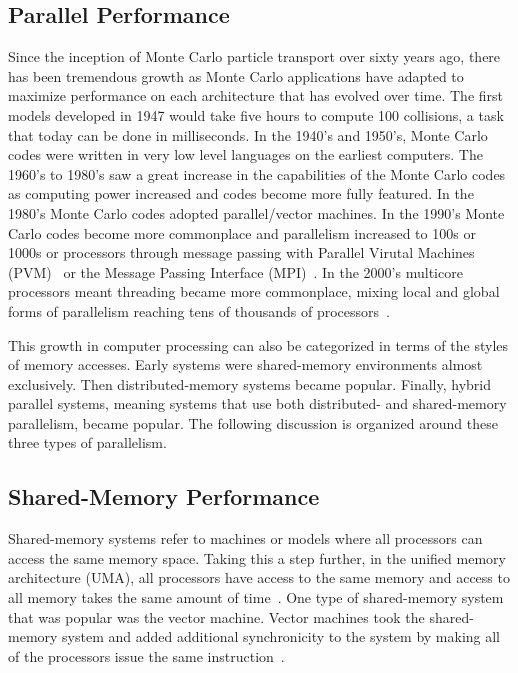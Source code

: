 \subsection{ \textbf{ Parallel Performance }}

Since the inception of Monte Carlo particle transport over sixty years ago,
there has been tremendous growth as Monte Carlo applications have adapted to maximize performance on each architecture that has evolved over time.
%
The first models developed in 1947 would take five hours to compute 100 collisions, a task that today can be done in milliseconds.
%
In the 1940's and 1950's, Monte Carlo codes were written in very low level languages on the earliest computers.
%
The 1960's to 1980's saw a great increase in the capabilities of the Monte Carlo codes as computing power increased and codes become more fully featured.
%
In the 1980's Monte Carlo codes adopted parallel/vector machines.
%
In the 1990's Monte Carlo codes become more commonplace and parallelism increased to 100s or 1000s or processors through message passing with Parallel Virutal Machines (PVM)~\cite{pvm2011} or the Message Passing Interface (MPI)~\cite{blaiseMPI}.
%
In the 2000's multicore processors meant threading became more commonplace, mixing local and global forms of parallelism reaching tens of thousands of processors~\cite{brown2011recent}.
%

This growth in computer processing can also be categorized in terms of the styles of memory accesses.
%
Early systems were shared-memory environments almost exclusively.
%
Then distributed-memory systems became popular.
%
Finally, hybrid parallel systems, meaning systems that use both distributed- and shared-memory parallelism, became popular.
%
The following discussion is organized around these three types of parallelism.

\subsection*{ \textbf{Shared-Memory Performance}} 

Shared-memory systems refer to machines or models where all processors can access the same memory space.
%
Taking this a step further, in the unified memory architecture (UMA), all processors have access to the same memory and access to all memory takes the same amount of time~\cite{el2005advanced}.
%
One type of shared-memory system that was popular was the vector machine.
%
Vector machines took the shared-memory system and added additional synchronicity to the system by making all of the processors issue the same instruction~\cite{russell1978cray}.
%


